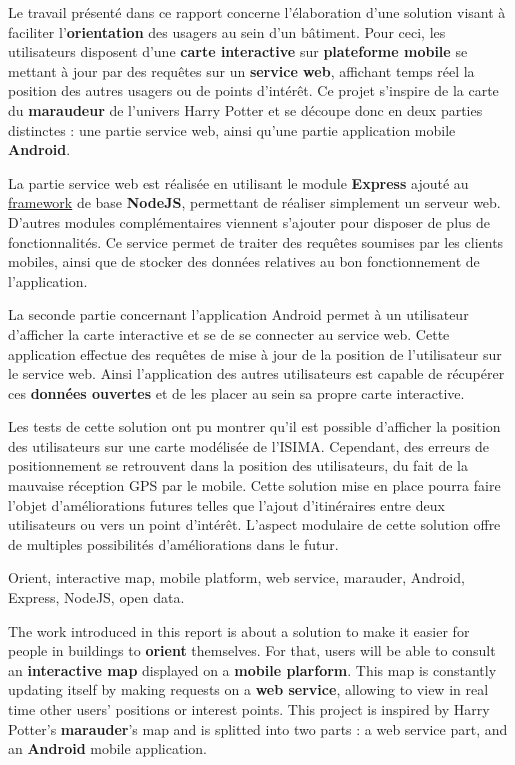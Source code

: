

Le travail présenté dans ce rapport concerne l'élaboration d'une solution visant à faciliter l’\textbf{orientation} des usagers au sein d'un bâtiment. Pour ceci, les utilisateurs disposent d'une \textbf{carte interactive} sur \textbf{plateforme mobile} se mettant à jour par des requêtes sur un \textbf{service web}, affichant temps réel la position des autres usagers ou de points d’intérêt. Ce projet s’inspire de la carte du \textbf{maraudeur} de l’univers Harry Potter et se découpe donc en deux parties distinctes : une partie service web, ainsi qu'une partie application mobile \textbf{Android}.

La partie service web est réalisée en utilisant le module \textbf{Express} ajouté au \underline{framework} de base \textbf{NodeJS}, permettant de réaliser simplement un serveur web. D'autres modules complémentaires viennent s'ajouter pour disposer de plus de fonctionnalités. Ce service permet de traiter des requêtes soumises par les clients mobiles, ainsi que de stocker des données relatives au bon fonctionnement de l'application.

La seconde partie concernant l'application Android permet à un utilisateur d’afficher la carte interactive et se de se connecter au service web. Cette application effectue des requêtes de mise à jour de la position de l'utilisateur sur le service web. Ainsi l’application des autres utilisateurs est capable de récupérer ces \textbf{données ouvertes} et de les placer au sein sa propre carte interactive.

Les tests de cette solution ont pu montrer qu'il est possible d'afficher la position des utilisateurs sur une carte modélisée de l'ISIMA. Cependant, des erreurs de positionnement se retrouvent dans la position des utilisateurs, du fait de la mauvaise réception GPS par le mobile. Cette solution mise en place pourra faire l'objet d'améliorations futures telles que l'ajout d'itinéraires entre deux utilisateurs ou vers un point d'intérêt. L'aspect modulaire de cette solution offre de multiples possibilités d'améliorations dans le futur.


Orient, interactive map, mobile platform, web service, marauder, Android, Express, NodeJS, open data.


The work introduced in this report is about a solution to make it easier for people in buildings to \textbf{orient} themselves. For that, users will be able to consult an \textbf{interactive map} displayed on a \textbf{mobile plarform}. This map is constantly updating itself by making requests on a \textbf{web service}, allowing to view in real time other users' positions or interest points. This project is inspired by Harry Potter's \textbf{marauder}'s map and is splitted into two parts : a web service part, and an \textbf{Android} mobile application.

